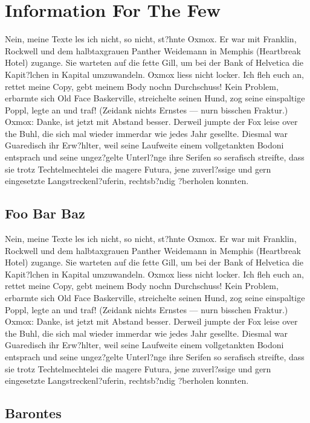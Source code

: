 \chapter{Information For The Few}

Nein, meine Texte les ich nicht, so nicht, st?hnte Oxmox. Er war mit Franklin, Rockwell und dem halbtaxgrauen Panther Weidemann in Memphis (Heartbreak Hotel) zugange. Sie warteten auf die fette Gill, um bei der Bank of Helvetica die Kapit?lchen in Kapital umzuwandeln. Oxmox liess nicht locker. Ich fleh euch an, rettet meine Copy, gebt meinem Body nochn Durchschuss! Kein Problem, erbarmte sich Old Face Baskerville, streichelte seinen Hund, zog seine einspaltige Poppl, legte an und traf! (Zeidank nichts Ernstes --- nurn bisschen Fraktur.) Oxmox: Danke, ist jetzt mit Abstand besser. Derweil jumpte der Fox leise over the Buhl, die sich mal wieder immerdar wie jedes Jahr gesellte. Diesmal war Guaredisch ihr Erw?hlter, weil seine Laufweite einem vollgetankten Bodoni entsprach und seine ungez?gelte Unterl?nge ihre Serifen so serafisch streifte, dass sie trotz Techtelmechtelei die magere Futura, jene zuverl?ssige und gern eingesetzte Langstreckenl?uferin, rechtsb?ndig ?berholen konnten.

\section{Foo Bar Baz}

Nein, meine Texte les ich nicht, so nicht, st?hnte Oxmox. Er war mit Franklin, Rockwell und dem halbtaxgrauen Panther Weidemann in Memphis (Heartbreak Hotel) zugange. Sie warteten auf die fette Gill, um bei der Bank of Helvetica die Kapit?lchen in Kapital umzuwandeln. Oxmox liess nicht locker. Ich fleh euch an, rettet meine Copy, gebt meinem Body nochn Durchschuss! Kein Problem, erbarmte sich Old Face Baskerville, streichelte seinen Hund, zog seine einspaltige Poppl, legte an und traf! (Zeidank nichts Ernstes --- nurn bisschen Fraktur.) Oxmox: Danke, ist jetzt mit Abstand besser. Derweil jumpte der Fox leise over the Buhl, die sich mal wieder immerdar wie jedes Jahr gesellte. Diesmal war Guaredisch ihr Erw?hlter, weil seine Laufweite einem vollgetankten Bodoni entsprach und seine ungez?gelte Unterl?nge ihre Serifen so serafisch streifte, dass sie trotz Techtelmechtelei die magere Futura, jene zuverl?ssige und gern eingesetzte Langstreckenl?uferin, rechtsb?ndig ?berholen konnten.

\section{Barontes}

